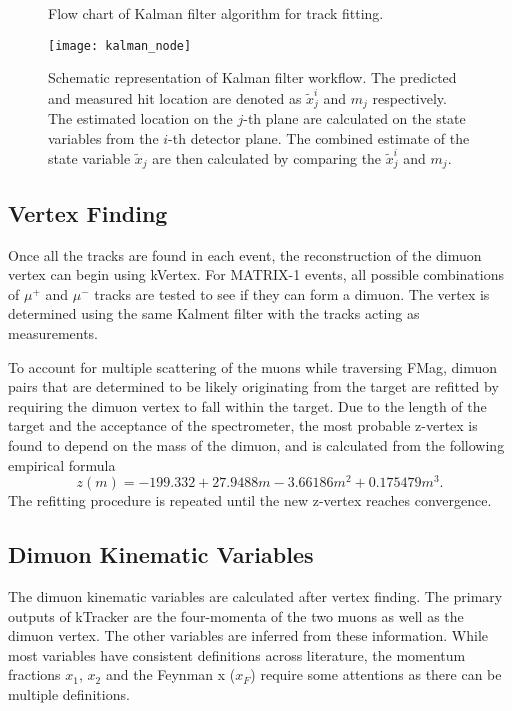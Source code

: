 \documentclass[../main.tex]{subfiles}
\begin{document}
\begin{figure}
	\centering
	
	\caption{Flow chart of Kalman filter algorithm for track fitting.}
	\label{fig:kalman_flowchart}
\end{figure}

\begin{figure}
	\centering
	\texttt{[image: kalman\_node]}
	\caption{Schematic representation of Kalman filter workflow. The predicted and measured hit location
		are denoted as $\tilde{x}^i_j$ and $m_j$ respectively. The estimated location on the $j$-th plane
		are calculated on the state variables from the $i$-th detector plane. The combined estimate of the
		state variable $\tilde{x}_j$ are then calculated by comparing the $\tilde{x}^i_j$ and $m_j$.}
	\label{fig:kalman_node}
\end{figure}

\subsection{Vertex Finding}
Once all the tracks are found in each event, the reconstruction of the dimuon vertex can begin using kVertex.
For MATRIX-1 events, all possible combinations of $\mu^+$ and $\mu^-$ tracks are tested to see if they can form
a dimuon. The vertex is determined using the same Kalment filter with the tracks acting as measurements.

To account for multiple scattering of the muons while traversing FMag, dimuon pairs that are
determined to be likely originating from the target are refitted by requiring the dimuon vertex to
fall within the target. Due to the length of the target and the acceptance of the spectrometer,
the most probable z-vertex is found to depend on the mass of the dimuon, and is calculated from the
following empirical formula~\cite{kun-1283}
\begin{equation}
	z\left(m\right) = -199.332 + 27.9488 m - 3.66186 m^2 + 0.175479 m^3.
\end{equation}
The refitting procedure is repeated until the new z-vertex reaches convergence.


\subsection{Dimuon Kinematic Variables}
\label{subsec:def_kinematic}
The dimuon kinematic variables are calculated after vertex finding. The primary outputs of kTracker
are the four-momenta of the two muons as well as the dimuon vertex. The other variables are inferred
from these information. While most variables have consistent definitions across literature, the momentum
fractions $x_1$, $x_2$ and the Feynman x ($x_F$) require some attentions as there can be multiple definitions.
\end{document}
